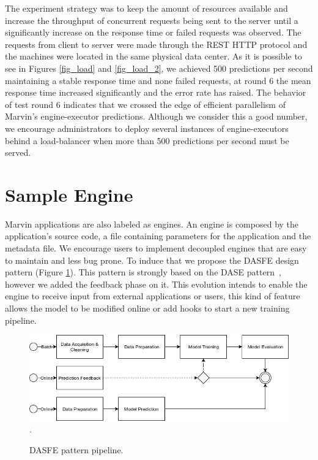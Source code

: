 \documentclass[twoside,11pt]{article}
\begin{document}
The experiment strategy was to keep the amount of resources available and increase the throughput of concurrent requests being sent to the server until a significantly increase on the response time or failed requests was observed. The requests from client to server were made through the REST HTTP protocol and the machines were located in the same physical data center. As it is possible to see in Figures \ref{fig_load} and \ref{fig_load_2}, we achieved 500 predictions per second maintaining a stable response time and none failed requests, at round 6 the mean response time increased significantly and the error rate has raised. The behavior of test round 6 indicates that we crossed the edge of efficient parallelism of Marvin's engine-executor predictions. Although we consider this a good number, we encourage administrators to deploy several instances of engine-executors behind a load-balancer when more than 500 predictions per second must be served.

\newpage
\section{Sample Engine}

Marvin applications are also labeled as engines. An engine is composed by the application's source code, a file containing parameters for the application and the metadata file. We encourage users to implement decoupled engines that are easy to maintain and less bug prone. To induce that we propose the DASFE design pattern (Figure \ref{fig_dase}). This pattern is strongly based on the DASE pattern~\citep{chan2013predictionio}, however we added the feedback phase on it. This evolution intends to enable the engine to receive input from external applications or users, this kind of feature allows the model to be modified online or add hooks to start a new training pipeline.

\begin{figure}[h]
\centering
\includegraphics[scale=0.6]{fig/marvin-dase.png}
\DeclareGraphicsExtensions.
\caption{DASFE pattern pipeline.}
\label{fig_dase}
\end{figure}
\end{document}
